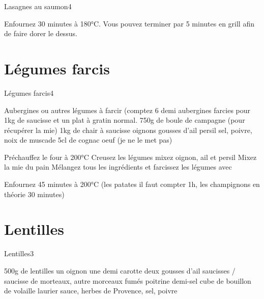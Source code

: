 {\begin{recette}{Lasagnes au saumon}{4}{}{}
\begin{cuisson}
Enfournez 30 minutes à 180°C. Vous pouvez terminer par 5 minutes en grill afin de faire dorer le dessus.
\end{cuisson}
\end{recette}

\section{Légumes farcis}
\begin{recette}{Légumes farcis}{4}{}{}
\begin{ingredients}
\ingredient Aubergines ou autres légumes à farcir (comptez 6 demi aubergines farcies pour 1kg de saucisse et un plat à gratin normal.
\ingredient[Farce]
\ingredient 750g de boule de campagne (pour récupérer la mie)
\ingredient 1kg de chair à saucisse
 oignons
 gousses d'ail
\ingredient persil
\ingredient sel, poivre, noix de muscade
\ingredient 5cl de cognac
 oeuf (je ne le met pas)
\end{ingredients}

\begin{preparation}
\etape Préchauffez le four à 200°C
\etape Creusez les légumes
\etape mixez oignon, ail et persil
\etape Mixez la mie du pain
\etape Mélangez tous les ingrédients et farcissez les légumes avec
\end{preparation}

\begin{cuisson}
Enfournez 45 minutes à 200°C (les patates il faut compter 1h, les champignons en théorie 30 minutes)
\end{cuisson}
\end{recette}

\section{Lentilles}
\begin{recette}{Lentilles}{3}{}{}
\begin{ingredients}
\ingredient 500g de lentilles
\ingredient un oignon
\ingredient une demi carotte
\ingredient deux gousses d'ail
 saucisses / saucisse de morteaux, autre morceaux fumés
\ingredient poitrine demi-sel
\ingredient cube de bouillon de volaille
\ingredient laurier sauce, herbes de Provence, sel, poivre
\end{ingredients}


\end{recette}}
